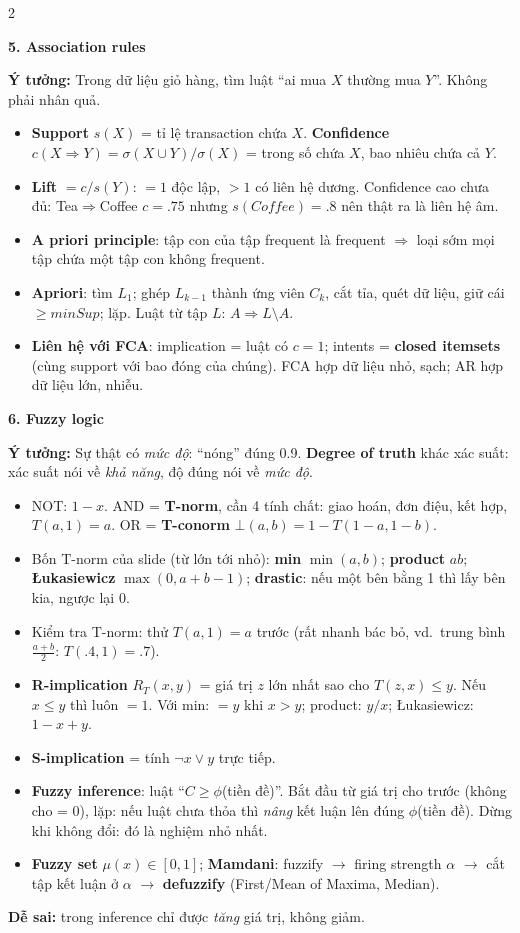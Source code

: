 \documentclass[10pt]{article}
\newcommand{\kw}[1]{\textbf{#1}}
\newcommand{\sect}[1]{\par\vspace{6pt}\noindent\colorbox{h1}{\parbox{\dimexpr\linewidth-2\fboxsep}{\large\bfseries\color{white}#1}}\par\vspace{2pt}}
\newcommand{\idea}[1]{\par\noindent\colorbox{bg}{\parbox{\dimexpr\linewidth-2\fboxsep}{\textbf{Ý tưởng:} #1}}\par}
\newcommand{\warn}[1]{\par\noindent\colorbox{wn}{\parbox{\dimexpr\linewidth-2\fboxsep}{\textbf{Dễ sai:} #1}}\par}
\begin{document}
\begin{multicols}{2}
\sect{5. Association rules}
\idea{Trong dữ liệu giỏ hàng, tìm luật ``ai mua $X$ thường mua $Y$''. Không phải nhân quả.}
\begin{itemize}
\item \kw{Support} $s(X)$ = tỉ lệ transaction chứa $X$. \kw{Confidence} $c(X\Rightarrow Y)=\sigma(X\cup Y)/\sigma(X)$ = trong số chứa $X$, bao nhiêu chứa cả $Y$.
\item \kw{Lift} $=c/s(Y)$: $=1$ độc lập, $>1$ có liên hệ dương. Confidence cao chưa đủ: Tea$\Rightarrow$Coffee $c=.75$ nhưng $s(Coffee)=.8$ nên thật ra là liên hệ âm.
\item \kw{A priori principle}: tập con của tập frequent là frequent $\Rightarrow$ loại sớm mọi tập chứa một tập con không frequent.
\item \kw{Apriori}: tìm $L_1$; ghép $L_{k-1}$ thành ứng viên $C_k$, cắt tỉa, quét dữ liệu, giữ cái $\ge minSup$; lặp. Luật từ tập $L$: $A\Rightarrow L\setminus A$.
\item \kw{Liên hệ với FCA}: implication = luật có $c=1$; intents = \kw{closed itemsets} (cùng support với bao đóng của chúng). FCA hợp dữ liệu nhỏ, sạch; AR hợp dữ liệu lớn, nhiễu.
\end{itemize}

\sect{6. Fuzzy logic}
\idea{Sự thật có \emph{mức độ}: ``nóng'' đúng 0.9. \kw{Degree of truth} khác xác suất: xác suất nói về \emph{khả năng}, độ đúng nói về \emph{mức độ}.}
\begin{itemize}
\item NOT: $1-x$. AND = \kw{T-norm}, cần 4 tính chất: giao hoán, đơn điệu, kết hợp, $T(a,1)=a$. OR = \kw{T-conorm} $\bot(a,b)=1-T(1-a,1-b)$.
\item Bốn T-norm của slide (từ lớn tới nhỏ): \kw{min} $\min(a,b)$; \kw{product} $ab$; \kw{Łukasiewicz} $\max(0,a+b-1)$; \kw{drastic}: nếu một bên bằng 1 thì lấy bên kia, ngược lại 0.
\item Kiểm tra T-norm: thử $T(a,1)=a$ trước (rất nhanh bác bỏ, vd.\ trung bình $\frac{a+b}2$: $T(.4,1)=.7$).
\item \kw{R-implication} $R_T(x,y)$ = giá trị $z$ lớn nhất sao cho $T(z,x)\le y$. Nếu $x\le y$ thì luôn $=1$. Với min: $=y$ khi $x>y$; product: $y/x$; Łukasiewicz: $1-x+y$.
\item \kw{S-implication} = tính $\neg x\vee y$ trực tiếp.
\item \kw{Fuzzy inference}: luật ``$C\ge\phi$(tiền đề)''. Bắt đầu từ giá trị cho trước (không cho = 0), lặp: nếu luật chưa thỏa thì \emph{nâng} kết luận lên đúng $\phi$(tiền đề). Dừng khi không đổi: đó là nghiệm nhỏ nhất.
\item \kw{Fuzzy set} $\mu(x)\in[0,1]$; \kw{Mamdani}: fuzzify $\to$ firing strength $\alpha$ $\to$ cắt tập kết luận ở $\alpha$ $\to$ \kw{defuzzify} (First/Mean of Maxima, Median).
\end{itemize}
\warn{trong inference chỉ được \emph{tăng} giá trị, không giảm.}


\end{multicols}
\end{document}
